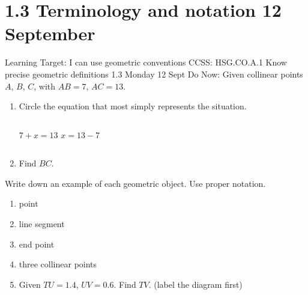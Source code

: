 \section{1.3 Terminology and notation \hfill 12 September}
\begin{frame}{Learning Target: I can use geometric conventions}
  {CCSS: HSG.CO.A.1 Know precise geometric definitions \hfill \alert{1.3 Monday 12 Sept}}
  Do Now: Given collinear points $A$, $B$, $C$, with $AB=7$, $AC=13$.
  \begin{center}
  \end{center}
  \begin{enumerate}
    \item Circle the equation that most simply represents the situation.
    \begin{columns}[c]
      $7 + x = 13$
      $x = 13 - 7$
    \end{columns}
    \item Find $BC$.
  \end{enumerate}
  \end{frame}

\begin{frame}{Write down an example of each geometric object.}
{Use proper notation.}
  \begin{enumerate}
    \item point
    \item line segment
    \item end point
    \item three collinear points
    \item Given $TU=1.4$, $UV=0.6$. Find $TV$. (label the diagram first)
  \end{enumerate}
\end{frame}


